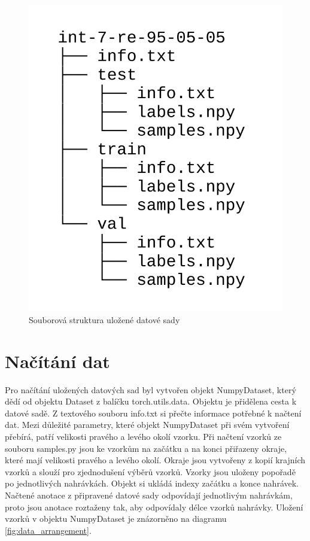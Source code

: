 \documentclass[FM,BP]{tulthesis}
\begin{document}
\begin{figure}[h]
\centerline{\includegraphics[scale=.22]{dataset_file_structure.png}}
\caption{Souborová struktura uložené datové sady}
\label{fig:file_structure}
\end{figure}
\FloatBarrier

\section{Načítání dat} %
Pro načítání uložených datových sad byl vytvořen objekt NumpyDataset, který dědí od objektu Dataset z balíčku torch.utils.data. Objektu je přidělena cesta k datové sadě. Z textového souboru info.txt si přečte informace potřebné k načtení dat. Mezi důležité parametry, které objekt NumpyDataset při svém vytvoření přebírá, patří velikosti pravého a levého okolí vzorku. Při načtení vzorků ze souboru samples.py jsou ke vzorkům na začátku a na konci přiřazeny okraje, které mají velikosti pravého a levého okolí. Okraje jsou vytvořeny z kopií krajních vzorků a slouží pro zjednodušení výběrů vzorků. Vzorky jsou uloženy popořadě po jednotlivých nahrávkách. Objekt si ukládá indexy začátku a konce nahrávek. Načtené anotace z připravené datové sady odpovídají jednotlivým nahrávkám, proto jsou anotace roztaženy tak, aby odpovídaly délce vzorků nahrávky. Uložení vzorků v objektu NumpyDataset je znázorněno na diagramu \ref{fig:data_arrangement}.
\end{document}

